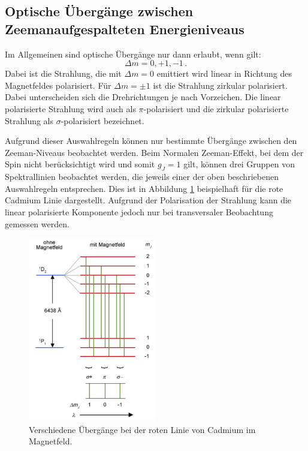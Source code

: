 \subsection{Optische Übergänge zwischen Zeemanaufgespalteten Energieniveaus}

Im Allgemeinen sind optische Übergänge nur dann erlaubt, wenn gilt:
\begin{equation}
  \Delta m= 0, +1 , -1 \,.
\end{equation}
Dabei ist die Strahlung, die mit $\Delta m= 0$ emittiert wird linear in Richtung des
Magnetfeldes polarisiert. Für $\Delta m= \pm1$ ist die Strahlung zirkular polarisiert.
Dabei unterscheiden sich die Drehrichtungen je nach Vorzeichen. Die linear polarisierte
Strahlung wird auch als $\pi$-polarisiert und die zirkular polarisierte Strahlung als
$\sigma$-polarisiert bezeichnet.

Aufgrund dieser Auswahlregeln können nur bestimmte Übergänge zwischen den Zeeman-Niveaus
beobachtet werden. Beim Normalen Zeeman-Effekt, bei dem der Spin nicht berücksichtigt wird
und somit $g_J=1$ gilt,
können drei Gruppen von Spektrallinien beobachtet werden, die jeweils einer der oben
beschriebenen Auswahlregeln entsprechen. Dies ist in Abbildung \ref{fig:cdrot} beispielhaft
für die rote Cadmium Linie dargestellt. Aufgrund der Polarisation der Strahlung kann
die linear polarisierte Komponente jedoch nur bei transversaler Beobachtung gemessen werden.

\begin{figure}
  \centering
  \includegraphics[width=0.5\textwidth]{data/cd_rot.png}
  \caption{Verschiedene Übergänge bei der roten Linie von Cadmium im Magnetfeld. \cite{cdrot}}
  \label{fig:cdrot}
\end{figure}

